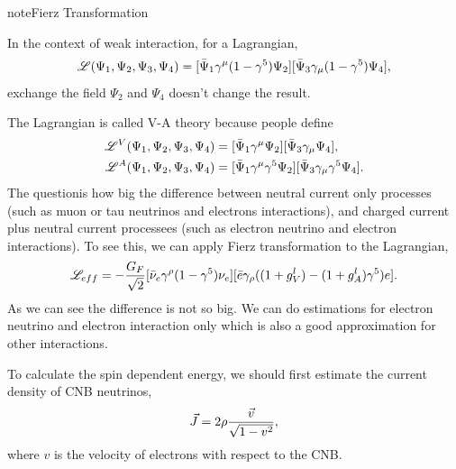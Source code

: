 \documentclass[letterpaper,12pt,english]{sphinxmanual}
\begin{document}
\begin{notice}{note}{Fierz Transformation}

In the context of weak interaction, for a Lagrangian,
\begin{gather}
\begin{split}\mathscr{L}(\Psi_1,\Psi_2,\Psi_3,\Psi_4) = [ \bar\Psi_1 \gamma^\mu ( 1 - \gamma^5 ) \Psi_2  ] [ \bar \Psi_3 \gamma_\mu ( 1-\gamma^5 ) \Psi_4 ],\end{split}\notag
\end{gather}
exchange the field \(\Psi_2\) and \(\Psi_4\) doesn't change the result.

The Lagrangian is called V-A theory because people define
\begin{gather}
\begin{split}\mathscr{L}^V(\Psi_1, \Psi_2,\Psi_3,\Psi_4) &= [ \bar\Psi_1 \gamma^\mu \Psi_2 ] [ \bar\Psi_3 \gamma_\mu \Psi_4 ] ,\\
\mathscr{L}^A (\Psi_1, \Psi_2,\Psi_3,\Psi_4) &= [ \bar\Psi_1 \gamma^\mu \gamma^5 \Psi_2 ]  [ \bar\Psi_3 \gamma_\mu \gamma^5 \Psi_4 ] .\end{split}\notag
\end{gather}
The questionis how big the difference between neutral current only processes (such as muon or tau neutrinos and electrons interactions), and charged current plus neutral current processees (such as electron neutrino and electron interactions). To see this, we can apply Fierz transformation to the Lagrangian,
\begin{gather}
\begin{split}\mathscr{L}_{eff} = -\frac{G_F}{\sqrt{2}} [ \bar \nu_e \gamma^\rho (1-\gamma^5) \nu_e ] [ \bar e \gamma_\rho ( (1+g_V^l) - (1+g_A^l) \gamma^5 ) e ]  .\end{split}\notag
\end{gather}
As we can see the difference is not so big. We can do estimations for electron neutrino and electron interaction only which is also a good approximation for other interactions.
\end{notice}

To calculate the spin dependent energy, we should first estimate the current density of CNB neutrinos,
\begin{gather}
\begin{split}\vec J = 2\rho \frac{\vec v }{ \sqrt{1-v^2} },\end{split}\notag
\end{gather}
where \(v\) is the velocity of electrons with respect to the CNB.
\end{document}
